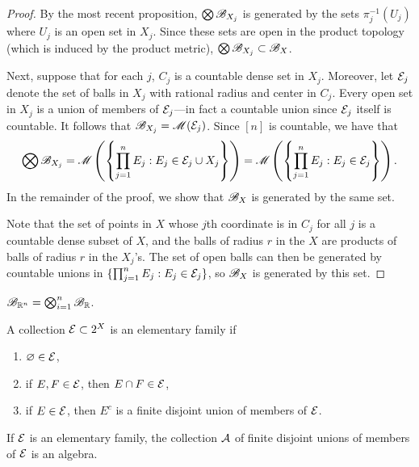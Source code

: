 \documentclass[12pt]{article} %
\begin{document}
\begin{proof}
    By the most recent proposition, $\bigotimes \mathscr{B}_{X_j}$ is generated by the sets $\pi_{j}^{-1}(U_j)$ where $U_j$ is an open set in $X_j$. Since these sets are open in the product topology (which is induced by the product metric), $\bigotimes \mathscr{B}_{X_j} \subset \mathscr{B}_X$.

    Next, suppose that for each $j$, $C_j$ is a countable dense set in $X_j$. Moreover, let $\mathcal{E}_j$ denote the set of balls in $X_j$ with rational radius and center in $C_j$. Every open set in $X_j$ is a union of members of $\mathcal{E}_j$---in fact a countable union since $\mathcal{E}_j$ itself is countable. It follows that $\mathscr{B}_{X_j} = \mathscr{M}(\mathcal{E}_j)$. Since $[n]$ is countable, we have that \[\bigotimes \mathscr{B}_{X_j} = \mathscr{M}\left(\left\{\prod_{j=1}^{n} E_j : E_j \in \mathcal{E}_j \cup X_j\right\}\right) = \mathscr{M}\left(\left\{\prod_{j=1}^{n} E_j : E_j \in \mathcal{E}_j\right\}\right).\] In the remainder of the proof, we show that $\mathscr{B}_X$ is generated by the same set.
    
    Note that the set of points in $X$ whose $j$th coordinate is in $C_j$ for all $j$ is a countable dense subset of $X$, and the balls of radius $r$ in the $X$ are products of balls of radius $r$ in the $X_j$'s. The set of open balls can then be generated by countable unions in $\{\prod_{j=1}^{n} E_j : E_j \in \mathcal{E}_j \}$, so $\mathscr{B}_X$ is generated by this set.
\end{proof}

\begin{corollary}
    $\mathscr{B}_{\mathbb{R}^n} = \bigotimes_{i=1}^{n} \mathscr{B}_{\mathbb{R}}$.
\end{corollary}

\begin{definition}
    A collection $\mathcal{E} \subset 2^X$ is an elementary family if \begin{enumerate}
        \item $\varnothing \in \mathcal{E}$,
        \item if $E, F \in \mathcal{E}$, then $E \cap F \in \mathcal{E}$,
        \item if $E \in \mathcal{E}$, then $E^c$ is a finite disjoint union of members of $\mathcal{E}$.
    \end{enumerate}
\end{definition}

\begin{proposition}
    If $\mathcal{E}$ is an elementary family, the collection $\mathcal{A}$ of finite disjoint unions of members of $\mathcal{E}$ is an algebra.
\end{proposition}
\end{document}
